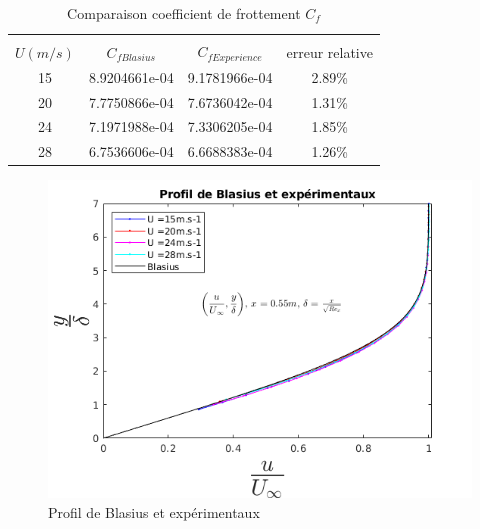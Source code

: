 \documentclass[french]{article}
\begin{document}
\begin{table}[ht]
	\centering
	\begin{tabular}{cccc}
		\hline\\
		$U(m/s)$ & $C_{fBlasius}$ &
		$ C_{fExperience}$ & 
		 erreur relative\\
		\hline
   15 & 8.9204661e-04   & 9.1781966e-04   & 2.89\%\\
   20 & 7.7750866e-04   & 7.6736042e-04   & 1.31\%\\
   24 & 7.1971988e-04   & 7.3306205e-04   & 1.85\%\\
   28 & 6.7536606e-04   & 6.6688383e-04   & 1.26\%
	\end{tabular}
	\caption{Comparaison coefficient de frottement $C_{f}$}
\end{table}
\begin{figure}[ht]
	\centering
	\includegraphics[scale = 0.6]{./image/Bla.png}
	\caption{Profil de Blasius et expérimentaux}
\end{figure}
\end{document}
